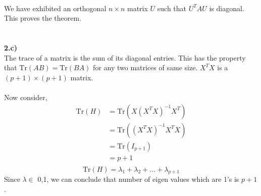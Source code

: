 \documentclass[17pt]{article}
\begin{document}
\\
We have exhibited an orthogonal $n\times n$ matrix $U$ such that $U^TAU$ is diagonal. This proves the theorem.\\
\\\\
\textbf{2.c)}\\
The trace of a matrix is the sum of its diagonal entries. This has the property that $\text{Tr}(AB)=\text{Tr}(BA)$ for any two matrices of same size. $X^TX$ is a $(p+1)\times(p+1)$ matrix.
\\\\
Now consider,
\begin{equation*}
\begin{aligned}
	\text{Tr}(H) &= \text{Tr}(X(X^TX)^{-1}X^T)\\
				 &= \text{Tr}((X^TX)^{-1}X^TX)\\
				 &= \text{Tr}(I_{p+1})\\
				 &= p+1\\
\end{aligned}
\end{equation*}
$$\text{Tr}(H) = \lambda_1 + \lambda_2 + ... + \lambda_{p+1}$$
Since $\lambda \in$ {0,1}, we can conclude that number of eigen values which are 1's is $p+1$. 


\newpage

\end{document}
